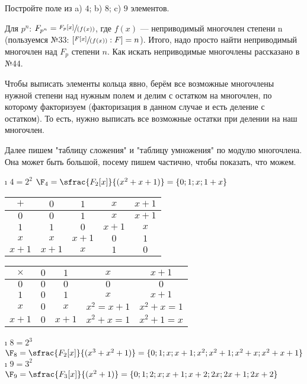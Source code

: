 \begin{problem}[45 (11.3)]
Постройте поле из a) $4$; b) $8$; c) $9$ элементов.
\end{problem}
\begin{solution}

Для \(p^n\): \(F_{p^n} = \sfrac{F_p[x]}{(f(x))}\), где \(f(x)\) --- неприводимый многочлен степени n (пользуемся №33: $[\sfrac{F[x]}{(f(x))}:F] = n$). Итого, надо просто найти неприводимый многочлен над \(F_p\) степени \(n\). Как искать неприводимые многочлены рассказано в №44.

Чтобы выписать элементы кольца явно, берём все возможные многочлены нужной степени над нужным полем и делим с остатком на многочлен, по которому факторизуем (факторизация в данном случае и есть деление с остатком). То есть, нужно выписать все возможные остатки при делении на наш многочлен.

Далее пишем "таблицу сложения" и "таблицу умножения" по модулю многочлена. Она может быть большой, посему пишем частично, чтобы показать, что можем.

\begin{enumerate}[label=\asbuk{enumi})]
\tightlist
\i
  \(4=2^2\)
  \(\F_4 = \sfrac{F_2[x]}{(x^2+x+1)} = \{0; 1;x;1+x\}\)
  
	\begin{table}[H]
	\centering
	\begin{tabular}{|c|c|c|c|c|}
	\hline
	$+$  & $0$ & $1$ & $x$    & $x+1$ \\ \hline
	$0$  & $0$ & $1$  & $x$    & $x+1$ \\ \hline
	$1$  & $1$ & $0$  & $x+1$    & $x$\\ \hline
	$x$  & $x$ & $x+1$  & $0$ & $1$\\ \hline
	$x+1$& $x+1$ & $x$& $1$ & $0$\\ \hline
	\end{tabular}
	\end{table}
  
	\begin{table}[H]
	\centering
	\begin{tabular}{|c|c|c|c|c|}
	\hline
	$\times$  & $0$ & $1$ & $x$    & $x+1$ \\ \hline
	$0$  & $0$ & $0$  & $0$    & $0$ \\ \hline
	$1$  & $0$ & $1$  & $x$    & $x+1$\\ \hline
	$x$  & $0$ & $x$  & $x^2=x+1$ & $x^2+x=1$\\ \hline
	$x+1$& $0$ & $x+1$& $x^2+x=1$ & $x^2+1=x$\\ \hline
	\end{tabular}
	\end{table}
\i
  \(8=2^3\)
  \(\F_8 = \sfrac{F_2[x]}{(x^3+x^2+1)} = \{0; 1; x; x+1; x^2; x^2+1; x^2+x; x^2+x+1 \}\)
\i
  \(9=3^2\)
  \(\F_9 = \sfrac{F_3[x]}{(x^2+1)} = \{ 0; 1; 2; x; x+1; x+2; 2x; 2x+1; 2x+2\}\)
\end{enumerate}
\end{solution}


